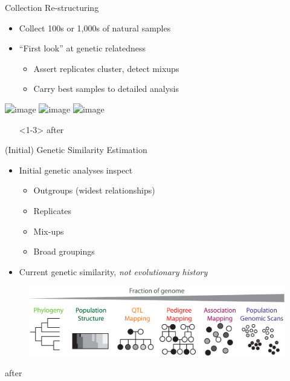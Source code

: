 \documentclass[t]{beamer}
\begin{document}
\begin{frame}{Collection Re-structuring}
  \begin{itemize}
    \item Collect 100s or 1,000s of natural samples
    \item ``First look'' at genetic relatedness
    \begin{itemize}
      \item Assert replicates cluster, detect mixups
      \item Carry best samples to detailed analysis
    \end{itemize}
  \end{itemize}
  \begin{center}
    \includegraphics<1>[width=\textwidth]{img/restruct-1}
    \includegraphics<2>[width=\textwidth]{img/restruct-2}
    \includegraphics<3>[width=\textwidth]{img/restruct-3}
    \begin{itemize}
      \item[]<1-3> \tiny{after \textcite{brachi_genome-wide_2011}}
    \end{itemize}
  \end{center}
\end{frame}


\begin{frame}{(Initial) Genetic Similarity Estimation}
  \begin{itemize}
    \item Initial genetic analyses inspect
      \begin{itemize}
        \item Outgroups (widest relationships)
        \item Replicates
        \item Mix-ups
        \item Broad groupings
      \end{itemize}
    \item Current genetic similarity, \textit{not evolutionary history}
  \end{itemize}
  \begin{figure}
    \centering
    \includegraphics[width=\textwidth]{img/cross-scale.png}
  \end{figure}
  \tiny{after \textcite{peterson_double_2012}}
\end{frame}
\end{document}
